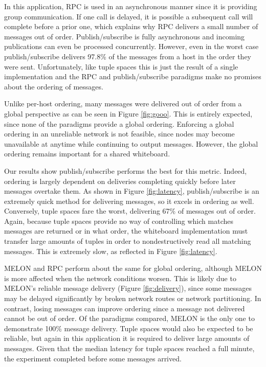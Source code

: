 In this application, RPC is used in an asynchronous manner since it is providing group communication. If one call is delayed, it is possible a subsequent call will complete before a prior one, which explains why RPC delivers a small number of messages out of order. Publish/subscribe is fully asynchronous and incoming publications can even be processed concurrently. However, even in the worst case publish/subscribe delivers 97.8\% of the messages from a host in the order they were sent. Unfortunately, like tuple spaces this is just the result of a single implementation and the RPC and publish/subscribe paradigms make no promises about the ordering of messages.

Unlike per-host ordering, many messages were delivered out of order from a global perspective as can be seen in Figure \ref{fig:gooo}. This is entirely expected, since none of the paradigms provide a global ordering. Enforcing a global ordering in an unreliable network is not feasible, since nodes may become unavailable at anytime while continuing to output messages. However, the global ordering remains important for a shared whiteboard.

Our results show publish/subscribe performs the best for this metric. Indeed, ordering is largely dependent on deliveries completing quickly before later messages overtake them. As shown in Figure \ref{fig:latency}, publish/subscribe is an extremely quick method for delivering messages, so it excels in ordering as well. Conversely, tuple spaces fare the worst, delivering 67\% of messages out of order. Again, because tuple spaces provide no way of controlling which matches messages are returned or in what order, the whiteboard implementation must transfer large amounts of tuples in order to nondestructively read all matching messages. This is extremely slow, as reflected in Figure \ref{fig:latency}.

MELON and RPC perform about the same for global ordering, although MELON is more affected when the network conditions worsen. This is likely due to MELON's reliable message delivery (Figure \ref{fig:delivery}), since some messages may be delayed significantly by broken network routes or network partitioning. In contrast, losing messages can improve ordering since a message not delivered cannot be out of order. Of the paradigms compared, MELON is the only one to demonstrate 100\% message delivery. Tuple spaces would also be expected to be reliable, but again in this application it is required to deliver large amounts of messages. Given that the median latency for tuple spaces reached a full minute, the experiment completed before some messages arrived.

